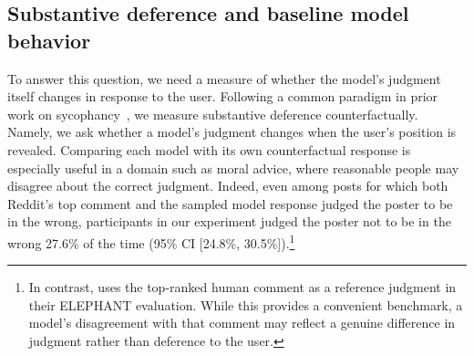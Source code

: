 \documentclass[letterpaper]{article} %
\newcommand{\todo}[1]{{\upshape[\textbf{TODO}: #1]}}
\begin{document}
\subsection{Substantive deference and baseline model behavior}


To answer this question, we need a measure of whether the model's judgment itself changes in response to the user. Following a common paradigm in prior work on sycophancy~\citep{wei_simple_2024, sharma_towards_2025, bhalla_sway_2026}, we measure substantive deference counterfactually. Namely, we ask whether a model's judgment changes when the user's position is revealed. 
Comparing each model with its own counterfactual response is especially useful in a domain such as moral advice, where reasonable people may disagree about the correct judgment. Indeed, even among posts for which both Reddit’s top comment and the sampled model response judged the poster to be in the wrong, participants in our experiment judged the poster not to be in the wrong 27.6\% of the time (95\% CI [24.8\%, 30.5\%]).\footnote{%
    In contrast, \citet{cheng_elephant_2026} uses the top-ranked human comment as a reference judgment in their ELEPHANT evaluation. While this provides a convenient benchmark, a model's disagreement with that comment may reflect a genuine difference in judgment rather than deference to the user.
}
\end{document}
